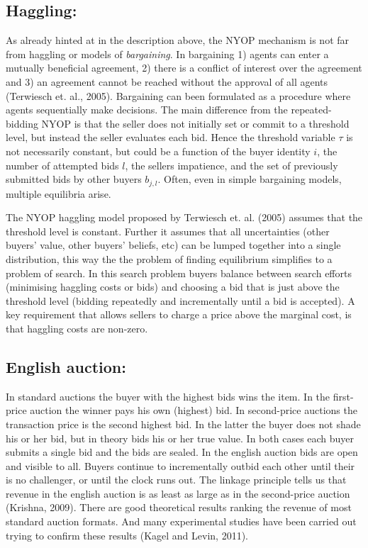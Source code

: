 \documentclass[a4paper,12pt]{article}
\begin{document}
	\subsection{Haggling:}

	As already hinted at in the description above, the NYOP mechanism is not far from haggling or models of {\it bargaining}. In bargaining 1) agents can enter a mutually beneficial agreement, 2) there is a conflict of interest over the agreement and 3) an agreement cannot be reached without the approval of all agents (Terwiesch et. al., 2005). Bargaining can been formulated as a procedure where agents sequentially make decisions. The main difference from the repeated-bidding NYOP is that the seller does not initially set or commit to a threshold level, but instead the seller evaluates each bid. Hence the threshold variable $\tau$ is not necessarily constant, but could be a function of the buyer identity $i$, the number of attempted bids $l$, the sellers impatience, and the set of previously submitted bids by other buyers $b_{j,l}$. Often, even in simple bargaining models, multiple equilibria arise.

	The NYOP haggling model proposed by Terwiesch et. al. (2005) assumes that the threshold level is constant. Further it assumes that all uncertainties (other buyers' value, other buyers' beliefs, etc) can be lumped together into a single distribution, this way the the problem of finding equilibrium simplifies to a problem of search. In this search problem buyers balance between search efforts (minimising haggling costs or bids) and choosing a bid that is just above the threshold level (bidding repeatedly and incrementally until a bid is accepted). A key requirement that allows sellers to charge a price above the marginal cost, is that haggling costs are non-zero.

	\subsection{English auction:}

	In standard auctions the buyer with the highest bids wins the item. In the first-price auction the winner pays his own (highest) bid. In second-price auctions the transaction price is the second highest bid. In the latter the buyer does not shade his or her bid, but in theory bids his or her true value. In both cases each buyer submits a single bid and the bids are sealed. In the english auction bids are open and visible to all. Buyers continue to incrementally outbid each other until their is no challenger, or until the clock runs out. The linkage principle tells us that revenue in the english auction is as least as large as in the second-price auction (Krishna, 2009). There are good theoretical results ranking the revenue of most standard auction formats. And many experimental studies have been carried out trying to confirm these results (Kagel and Levin, 2011). 
\end{document}
